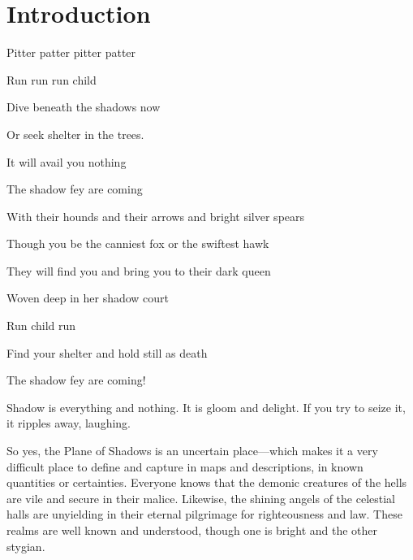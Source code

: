 \documentclass[10pt,a4paper,twoside,bg=print,twocolumn,openany,nodeprecatedcode]{dndbook}
\date{}
\begin{document}
\frontmatter
\tableofcontents
\mainmatter
{}
\chapter*{Introduction}
\begin{DndSidebar}[float=!b]{}
Pitter patter pitter patter



Run run run child



Dive beneath the shadows now



Or seek shelter in the trees.



It will avail you nothing



The shadow fey are coming



With their hounds and their arrows and bright silver spears



Though you be the canniest fox or the swiftest hawk



They will find you and bring you to their dark queen



Woven deep in her shadow court



Run child run



Find your shelter and hold still as death



The shadow fey are coming!



\end{DndSidebar}

Shadow is everything and nothing. It is gloom and delight. If you try to seize it, it ripples away, laughing.

So yes, the Plane of Shadows is an uncertain place—which makes it a very difficult place to define and capture in maps and descriptions, in known quantities or certainties. Everyone knows that the demonic creatures of the hells are vile and secure in their malice. Likewise, the shining angels of the celestial halls are unyielding in their eternal pilgrimage for righteousness and law. These realms are well known and understood, though one is bright and the other stygian.
\end{document}
